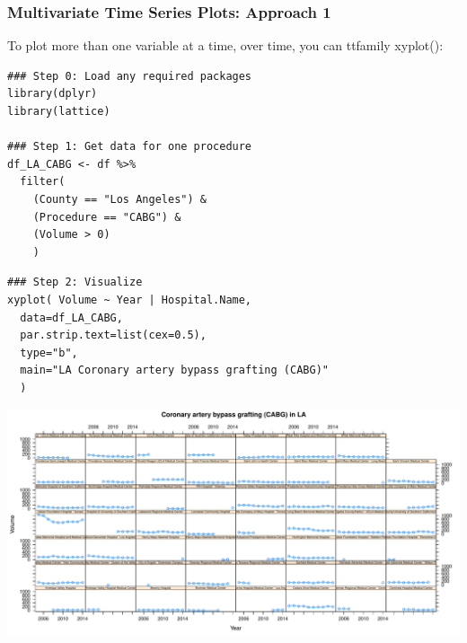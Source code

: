 \begin{frame}
 \frametitle{Multivariate Time Series Plots: Approach 1}

To plot more than one variable at a time, over time, you can ttfamily \use xyplot()\normalfont [5]:
		\begin{lstlisting}
### Step 0: Load any required packages
library(dplyr)
library(lattice)

### Step 1: Get data for one procedure
df_LA_CABG <- df %>%
  filter( 
    (County == "Los Angeles") & 
    (Procedure == "CABG") & 
    (Volume > 0) 
    )
    \end{lstlisting}

\newpage    
    \begin{lstlisting}
### Step 2: Visualize    
xyplot( Volume ~ Year | Hospital.Name, 
  data=df_LA_CABG,
  par.strip.text=list(cex=0.5),
  type="b",
  main="LA Coronary artery bypass grafting (CABG)"
  )
		\end{lstlisting}

\newpage
      \begin{center}
         \includegraphics[width=1.05\textwidth]{images/timeseries_LA_CABG}
      \end{center}
\end{frame}

